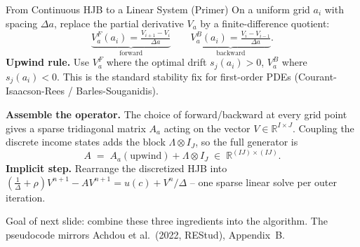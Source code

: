 \documentclass[aspectratio=169,11pt]{beamer}
\begin{document}
\begin{frame}{From Continuous HJB to a Linear System (Primer)}
\small
On a uniform grid $a_i$ with spacing $\Delta a$, replace the partial derivative $V_a$ by a finite-difference quotient:
\[
\underbrace{V_a^F(a_i) = \tfrac{V_{i+1}-V_i}{\Delta a}}_{\text{forward}}
\qquad
\underbrace{V_a^B(a_i) = \tfrac{V_i-V_{i-1}}{\Delta a}}_{\text{backward}}.
\]
\textbf{Upwind rule.} Use $V_a^F$ where the optimal drift $s_j(a_i) > 0$, $V_a^B$ where $s_j(a_i) < 0$. This is the standard stability fix for first-order PDEs (Courant-Isaacson-Rees / Barles-Souganidis).

\vspace{0.3em}
\textbf{Assemble the operator.} The choice of forward/backward at every grid point gives a sparse tridiagonal matrix $A_a$ acting on the vector $V \in \mathbb{R}^{I\times J}$. Coupling the discrete income states adds the block $\Lambda \otimes I_J$, so the full generator is
\[
A \;=\; A_a(\text{upwind}) + \Lambda \otimes I_J \;\in\; \mathbb{R}^{(IJ)\times(IJ)}.
\]
\textbf{Implicit step.} Rearrange the discretized HJB into $(\tfrac{1}{\Delta}+\rho)V^{n+1} - A V^{n+1} = u(c) + V^n/\Delta$ -- one sparse linear solve per outer iteration.

\vspace{0.3em}
{\scriptsize Goal of next slide: combine these three ingredients into the algorithm. The pseudocode mirrors Achdou et al.\ (2022, REStud), Appendix~B.}
\end{frame}
\end{document}
